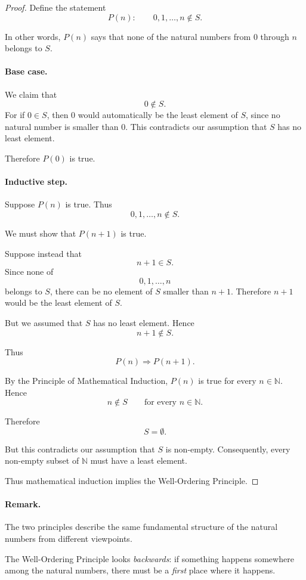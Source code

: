 \begin{proof}
Define the statement
\[
        P(n):
        \qquad
        0,1,\ldots,n\notin S.
\]

In other words, $P(n)$ says that none of the natural numbers from $0$
through $n$ belongs to $S$.

\paragraph{Base case.}
We claim that
\[
        0\notin S.
\]
For if $0\in S$, then $0$ would automatically be the least element of
$S$, since no natural number is smaller than $0$. This contradicts our
assumption that $S$ has no least element.

Therefore $P(0)$ is true.

\paragraph{Inductive step.}
Suppose $P(n)$ is true. Thus
\[
        0,1,\ldots,n\notin S.
\]

We must show that $P(n+1)$ is true.

Suppose instead that
\[
        n+1\in S.
\]
Since none of
\[
        0,1,\ldots,n
\]
belongs to $S$, there can be no element of $S$ smaller than $n+1$.
Therefore $n+1$ would be the least element of $S$.

But we assumed that $S$ has no least element. Hence
\[
        n+1\notin S.
\]

Thus
\[
        P(n)\Longrightarrow P(n+1).
\]

By the Principle of Mathematical Induction, $P(n)$ is true for every
$n\in\mathbb N$. Hence
\[
        n\notin S
        \qquad\text{for every }n\in\mathbb N.
\]

Therefore
\[
        S=\emptyset.
\]

But this contradicts our assumption that $S$ is non-empty. Consequently,
every non-empty subset of $\mathbb N$ must have a least element.

Thus mathematical induction implies the Well-Ordering Principle.
\end{proof}

\paragraph{Remark.} The two principles describe the same fundamental structure of the
natural numbers from different viewpoints.

The Well-Ordering Principle looks \emph{backwards}: if something happens
somewhere among the natural numbers, there must be a \emph{first} place
where it happens.

